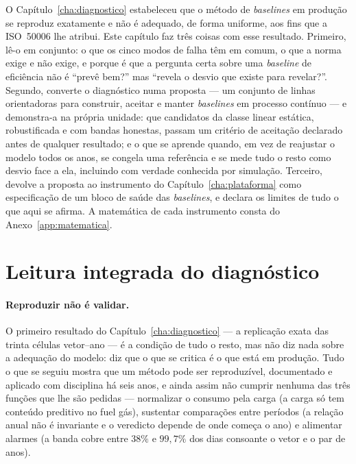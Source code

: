 O Capítulo~\ref{cha:diagnostico} estabeleceu que o método de \emph{baselines}
em produção se reproduz exatamente e não é adequado, de forma uniforme, aos
fins que a ISO~50006 lhe atribui. Este capítulo faz três coisas com esse
resultado. Primeiro, lê-o em conjunto: o que os cinco modos de falha têm em
comum, o que a norma exige e não exige, e porque é que a pergunta certa
sobre uma \emph{baseline} de eficiência não é ``prevê bem?'' mas ``revela o
desvio que existe para revelar?''. Segundo, converte o diagnóstico numa
proposta --- um conjunto de linhas orientadoras para construir, aceitar e
manter \emph{baselines} em processo contínuo --- e demonstra-a na própria
unidade: que candidatos da classe linear estática, robustificada e com
bandas honestas, passam um critério de aceitação declarado antes de
qualquer resultado; e o que se aprende quando, em vez de reajustar o modelo
todos os anos, se congela uma referência e se mede tudo o resto como desvio
face a ela, incluindo com verdade conhecida por simulação. Terceiro,
devolve a proposta ao instrumento do Capítulo~\ref{cha:plataforma} como
especificação de um bloco de saúde das \emph{baselines}, e declara os
limites de tudo o que aqui se afirma. A matemática de cada instrumento
consta do Anexo~\ref{app:matematica}.

\section{Leitura integrada do diagnóstico}
\label{sec:leitura-integrada}

\paragraph{Reproduzir não é validar.} O primeiro resultado do
Capítulo~\ref{cha:diagnostico} --- a replicação exata das trinta células
vetor--ano --- é a condição de tudo o resto, mas não diz nada sobre a
adequação do modelo: diz que o que se critica é o que está em produção.
Tudo o que se seguiu mostra que um método pode ser reproduzível, documentado
e aplicado com disciplina há seis anos, e ainda assim não cumprir nenhuma
das três funções que lhe são pedidas --- normalizar o consumo pela carga
(a carga só tem conteúdo preditivo no fuel gás), sustentar comparações entre
períodos (a relação anual não é invariante e o veredicto depende de onde
começa o ano) e alimentar alarmes (a banda cobre entre $38\%$ e $99{,}7\%$
dos dias consoante o vetor e o par de anos).

